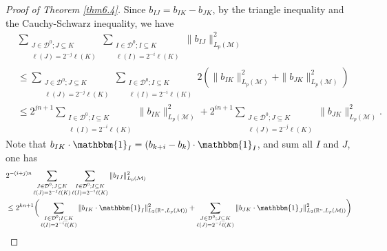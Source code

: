 \documentclass[oneside,english,a4wide]{amsart}
\numberwithin{equation}{section}
\numberwithin{figure}{section}
\theoremstyle{plain}
\theoremstyle{plain}
\theoremstyle{definition}
\theoremstyle{plain}
\theoremstyle{remark}
\theoremstyle{definition}
\theoremstyle{remark}
\theoremstyle{definition}
\newcommand{\8}{\infty}
\begin{document}
\begin{proof}[Proof of Theorem \ref{thm6.4}]
	Since $b_{IJ}=b_{IK}-b_{JK}$, by the triangle inequality and the Cauchy-Schwarz inequality, we have
	\begin{equation}
		\begin{aligned}
			{}&\sum_{\substack{J\in\mathcal{D}^0;J\subseteq K\\ \ell(J)=2^{-j}\ell(K)}}\sum_{\substack{I\in\mathcal{D}^0;I\subseteq K\\ \ell(I)=2^{-i}\ell(K)}}\|b_{IJ}\|_{L_p(\mathcal{M})}^2\\
			&\leq \sum_{\substack{J\in\mathcal{D}^0;J\subseteq K\\ \ell(J)=2^{-j}\ell(K)}}\sum_{\substack{I\in\mathcal{D}^0;I\subseteq K\\ \ell(I)=2^{-i}\ell(K)}} 2(\|b_{IK}\|_{L_p(\mathcal{M})}^2+\|b_{JK}\|_{L_p(\mathcal{M})}^2)\\
			&\le 2^{jn+1}\sum_{\substack{I\in\mathcal{D}^0;I\subseteq K\\ \ell(I)=2^{-i}\ell(K)}}\|b_{IK}\|_{L_p(\mathcal{M})}^2+2^{in+1}\sum_{\substack{J\in\mathcal{D}^0;J\subseteq K\\ \ell(J)=2^{-j}\ell(K)}}\|b_{JK}\|_{L_p(\mathcal{M})}^2.
		\end{aligned}
	\end{equation}
	Note that $b_{IK}\cdot \mathbbm{1}_I=(b_{k+i}-b_{k})\cdot \mathbbm{1}_I$, and sum all $I$ and $J$, one has
	\begin{equation}
		\begin{aligned}
			{}&2^{-(i+j)n}\sum_{\substack{J\in\mathcal{D}^0;J\subseteq K\\ \ell(J)=2^{-j}\ell(K)}}\sum_{\substack{I\in\mathcal{D}^0;I\subseteq K\\ \ell(I)=2^{-i}\ell(K)}}\|b_{IJ}\|_{L_p(\mathcal{M})}^2\\
			&\le 2^{kn+1}\bigg(\sum_{\substack{I\in\mathcal{D}^0;I\subseteq K\\ \ell(I)=2^{-i}\ell(K)}}\|b_{IK}\cdot \mathbbm{1}_I\|_{L_2(\mathbb{R}^n,L_p(\mathcal{M}))}^2+\sum_{\substack{J\in\mathcal{D}^0;J\subseteq K\\ \ell(J)=2^{-j}\ell(K)}}\|b_{JK}\cdot \mathbbm{1}_J\|_{L_2(\mathbb{R}^n,L_p(\mathcal{M}))}^2\bigg)\\

\end{aligned}
\end{equation}
\end{proof}
\end{document}
